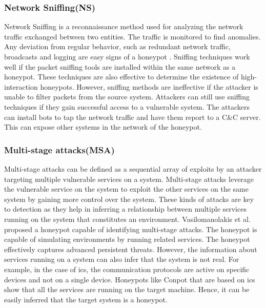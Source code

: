\subsubsection{Network Sniffing(NS)}
Network Sniffing is a reconnaissance method used for analyzing the network traffic exchanged between two entities. The traffic is monitored to find anomalies. Any deviation from regular behavior, such as redundant network traffic, broadcasts and logging are easy signs of a honeypot . Sniffing techniques work well if the packet sniffing tools are installed within the same network as a honeypot. These techniques are also effective to determine the existence of high-interaction honeypots. However, sniffing methods are ineffective if the attacker is unable to filter packets from the source system. Attackers can still use sniffing techniques if they gain successful access to a vulnerable system. The attackers can install bots to tap the network traffic and have them report to a C\&C  server. This can expose other systems in the network of the honeypot. 

\subsubsection{Multi-stage attacks(MSA)}
Multi-stage attacks can be defined as a sequential array of exploits by an attacker targeting multiple vulnerable services on a system. Multi-stage attacks leverage the vulnerable service on the system to exploit the other services on the same system by gaining more control over the system. These kinds of attacks are key to detection as they help in inferring a relationship between multiple services running on the system that constitutes an environment. Vasilomanolakis et al. \cite{vasilomanolakis} proposed a honeypot capable of identifying multi-stage attacks. The honeypot is capable of simulating environments by running related services. The honeypot effectively captures advanced persistent threats. However, the information about services running on a system can also infer that the system is not real. For example, in the case of \acrshort{ics}, the communication protocols are active on specific devices and not on a single device. Honeypots like Conpot that are based on \acrshort{ics} show that all the services are running on the target machine. Hence, it can be easily inferred that the target system is a honeypot. 

